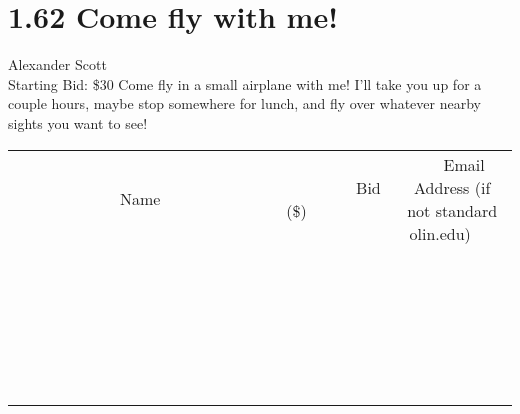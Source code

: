 \documentclass[11pt]{article}
\begin{document}
\section*{1.62 Come fly with me!}
Alexander Scott
\\
Starting Bid: \$30
\newline
Come fly in a small airplane with me! I'll take you up for a couple hours, maybe stop somewhere for lunch, and fly over whatever nearby sights you want to see!
\\[6ex]
\begin{tabular}{c c c}
~~~~~~~~~~~~~Name~~~~~~~~~~~~~ & ~~~~~~~~~Bid (\$)~~~~~~~~~  & ~~~Email Address (if not standard olin.edu)~~~\\
 & & \\
\hline
 & & \\
\hline
 & & \\
\hline
 & & \\
\hline
 & & \\
\hline
 & & \\
\hline
 & & \\
\hline
 & & \\
\hline
 & & \\
\hline
 & & \\
\hline
 & & \\
\hline
 & & \\
\hline
 & & \\
\hline
 & & \\
\hline
 & & \\
\hline
 & & \\
\hline
 & & \\
\hline
 & & \\
\hline
 & & \\
\hline
 & & \\
\hline
 & & \\
\hline
 & & \\
\hline
 & & \\
\hline
 & & \\
\hline
 & & \\
\hline
 & & \\
\hline
\end{tabular}
\newpage
\end{document}
